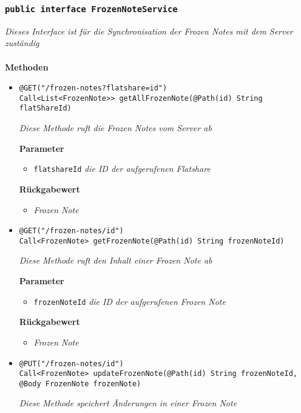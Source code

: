 	\subsubsection{\texttt{public interface FrozenNoteService }}
\textit{Dieses Interface ist für die Synchronisation der Frozen Notes mit dem Server zuständig}\\
\\
	\textbf{Methoden} 
		\begin{itemize}
		\item\texttt{{@GET("/frozen-notes?flatshare={id}")\\
Call<List<FrozenNote>> getAllFrozenNote(@Path(\grqq id\grqq) String flatShareId)}}

		\textit{Diese Methode ruft die Frozen Notes vom Server ab}

		\textbf{Parameter} 
			\begin{itemize}
				\item\texttt{flatshareId}
		 		\textit{die ID der aufgerufenen Flatshare}
	 		\end{itemize}

		\textbf{Rückgabewert} 
		\begin{itemize}
		\item\textit{Frozen Note}
		\end{itemize}
		
		
      \item\texttt{{@GET("/frozen-notes/{id}")\\ Call<FrozenNote> getFrozenNote(@Path(\grqq id\grqq) String frozenNoteId)}}

		\textit{Diese Methode ruft den Inhalt einer Frozen Note ab }
	
		\textbf{Parameter} 
			\begin{itemize}
				\item\texttt{frozenNoteId}
		 		\textit{die ID der aufgerufenen Frozen Note }
	 		\end{itemize}

		\textbf{Rückgabewert} 
		\begin{itemize}
		\item\textit{Frozen Note}
		\end{itemize}

	 \item\texttt{{@PUT("/frozen-notes/{id}")\\ Call<FrozenNote> updateFrozenNote(@Path(\grqq id\grqq) String frozenNoteId, @Body FrozenNote frozenNote)}}

		\textit{Diese Methode speichert Änderungen in einer Frozen Note}


\end{itemize}
